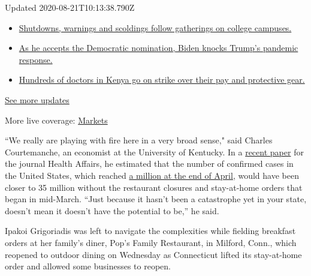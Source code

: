 Updated 2020-08-21T10:13:38.790Z

\begin{itemize}
\tightlist
\item
  \href{https://www.nytimes3xbfgragh.onion/2020/08/21/world/covid-19-coronavirus.html?action=click\&pgtype=Article\&state=default\&region=MAIN_CONTENT_1\&context=storylines_live_updates\#link-4690b6aa}{Shutdowns,
  warnings and scoldings follow gatherings on college campuses.}
\item
  \href{https://www.nytimes3xbfgragh.onion/2020/08/21/world/covid-19-coronavirus.html?action=click\&pgtype=Article\&state=default\&region=MAIN_CONTENT_1\&context=storylines_live_updates\#link-324af071}{As
  he accepts the Democratic nomination, Biden knocks Trump's pandemic
  response.}
\item
  \href{https://www.nytimes3xbfgragh.onion/2020/08/21/world/covid-19-coronavirus.html?action=click\&pgtype=Article\&state=default\&region=MAIN_CONTENT_1\&context=storylines_live_updates\#link-35890b73}{Hundreds
  of doctors in Kenya go on strike over their pay and protective gear.}
\end{itemize}

\href{https://www.nytimes3xbfgragh.onion/2020/08/21/world/covid-19-coronavirus.html?action=click\&pgtype=Article\&state=default\&region=MAIN_CONTENT_1\&context=storylines_live_updates}{See
more updates}

More live coverage:
\href{https://www.nytimes3xbfgragh.onion/live/2020/08/20/business/stock-market-today-coronavirus?action=click\&pgtype=Article\&state=default\&region=MAIN_CONTENT_1\&context=storylines_live_updates}{Markets}

``We really are playing with fire here in a very broad sense," said
Charles Courtemanche, an economist at the University of Kentucky. In a
\href{https://www.healthaffairs.org/doi/full/10.1377/hlthaff.2020.00608}{recent
paper} for the journal Health Affairs, he estimated that the number of
confirmed cases in the United States, which reached
\href{https://www.nytimes3xbfgragh.onion/2020/04/28/us/coronavirus-updates.html\#link-20ff56ca}{a
million at the end of April}, would have been closer to 35 million
without the restaurant closures and stay-at-home orders that began in
mid-March. ``Just because it hasn't been a catastrophe yet in your
state, doesn't mean it doesn't have the potential to be,'' he said.

Ipakoi Grigoriadis was left to navigate the complexities while fielding
breakfast orders at her family's diner, Pop's Family Restaurant, in
Milford, Conn., which reopened to outdoor dining on Wednesday as
Connecticut lifted its stay-at-home order and allowed some businesses to
reopen.

